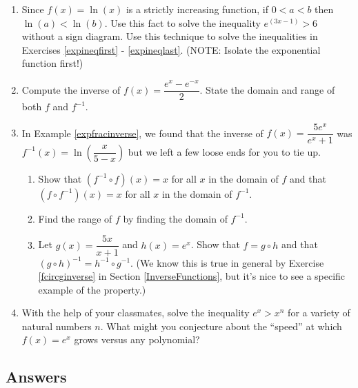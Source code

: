 \begin{enumerate}
\setcounter{enumi}{\value{HW}}

\item \label{onetoonelogexercise} Since $f(x) = \ln(x)$ is a strictly increasing function, if $0 < a < b$ then $\ln(a) < \ln(b)$.  Use this fact to solve the inequality $e^{(3x - 1)} > 6$ without a sign diagram. Use this technique to solve the inequalities in Exercises \ref{expineqfirst} - \ref{expineqlast}. (NOTE:  Isolate the exponential function first!)

\item \label{hyperbolicsine} Compute the inverse of $f(x) = \dfrac{e^{x} - e^{-x}}{2}$.  State the domain and range of both $f$ and $f^{-1}$. 

\item In Example \ref{expfracinverse}, we found that the inverse of $f(x) = \dfrac{5e^{x}}{e^{x}+1}$ was $f^{-1}(x) = \ln\left(\dfrac{x}{5-x}\right)$ but we left a few loose ends for you to tie up.  

\begin{enumerate}

\item Show that $\left(f^{-1} \circ f\right)(x) = x$ for all $x$ in the domain of $f$ and that $\left(f \circ f^{-1}\right)(x) = x$ for all $x$ in the domain of $f^{-1}$.

\item Find the range of $f$ by finding the domain of $f^{-1}$.

\item Let $g(x) = \dfrac{5x}{x+1}$ and $h(x) = e^{x}$.  Show that $f = g \circ h$ and that $(g \circ h)^{-1} = h^{-1} \circ g^{-1}$. 
(We know this is true in general by Exercise \ref{fcircginverse} in Section \ref{InverseFunctions}, but it's nice to see a specific example of the property.)

\end{enumerate}

\item With the help of your classmates, solve the inequality $e^{x} > x^{n}$ for a variety of natural numbers $n$.  What might you conjecture about the ``speed'' at which $f(x) = e^{x}$ grows versus any polynomial?

\end{enumerate}

\newpage

\subsection{Answers}


